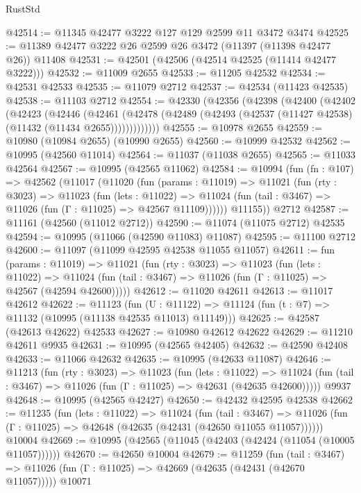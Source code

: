 \begin{lexlean}{RustStd}
\begin{coremodule}
@42514 := @11345 @42477 @3222 @127 @129 @2599 @11 @3472 @3474
@42525 := @11389 @42477 @3222 @26 @2599 @26 @3472 (@11397 (@11398 @42477 @26)) @11408
@42531 := @42501 (@42506 (@42514 @42525 (@11414 @42477 @3222)))
@42532 := @11009 @2655
@42533 := @11205 @42532
@42534 := @42531 @42533
@42535 := @11079 @2712
@42537 := @42534 (@11423 @42535)
@42538 := @11103 @2712
@42554 := @42330
    (@42356
      (@42398
        (@42400
          (@42402
            (@42423
              (@42446
                (@42461
                  (@42478 (@42489 (@42493 (@42537 (@11427 @42538) (@11432 (@11434 @2655)))))))))))))
@42555 := @10978 @2655
@42559 := @10980 (@10984 @2655) (@10990 @2655)
@42560 := @10999 @42532
@42562 := @10995 (@42560 @11014)
@42564 := @11037 (@11038 @2655)
@42565 := @11033 @42564
@42567 := @10995 (@42565 @11062)
@42584 := @10994
    (fun (fn : @107) =>
    @42562
      (@11017
        (@11020
          (fun (params : @11019) =>
          @11021
            (fun (rty : @3023) =>
            @11023
              (fun (lets : @11022) =>
              @11024 (fun (tail : @3467) => @11026 (fun (Γ : @11025) => @42567 @11109))))))
        @11155))
    @2712
@42587 := @11161 (@42560 (@11012 @2712))
@42590 := @11074 (@11075 @2712) @42535
@42594 := @10995 (@11066 (@42590 @11083) @11087)
@42595 := @11100 @2712
@42600 := @11097 (@11099 @42595 @42538 @11055 @11057)
@42611 := fun (params : @11019) =>
  @11021
    (fun (rty : @3023) =>
    @11023
      (fun (lets : @11022) =>
      @11024 (fun (tail : @3467) => @11026 (fun (Γ : @11025) => @42567 (@42594 @42600)))))
@42612 := @11020 @42611
@42613 := @11017 @42612
@42622 := @11123
    (fun (U : @11122) => @11124 (fun (t : @7) => @11132 (@10995 (@11138 @42535 @11013) @11149)))
@42625 := @42587 (@42613 @42622) @42533
@42627 := @10980 @42612 @42622
@42629 := @11210 @42611 @9935
@42631 := @10995 (@42565 @42405)
@42632 := @42590 @42408
@42633 := @11066 @42632
@42635 := @10995 (@42633 @11087)
@42646 := @11213
    (fun (rty : @3023) =>
    @11023
      (fun (lets : @11022) =>
      @11024 (fun (tail : @3467) => @11026 (fun (Γ : @11025) => @42631 (@42635 @42600)))))
    @9937
@42648 := @10995 (@42565 @42427)
@42650 := @42432 @42595 @42538
@42662 := @11235
    (fun (lets : @11022) =>
    @11024
      (fun (tail : @3467) =>
      @11026 (fun (Γ : @11025) => @42648 (@42635 (@42431 (@42650 @11055 @11057))))))
    @10004
@42669 := @10995 (@42565 (@11045 (@42403 (@42424 (@11054 (@10005 @11057))))))
@42670 := @42650 @10004
@42679 := @11259
    (fun (tail : @3467) => @11026 (fun (Γ : @11025) => @42669 (@42635 (@42431 (@42670 @11057)))))
    @10071

\end{coremodule}
\end{lexlean}
